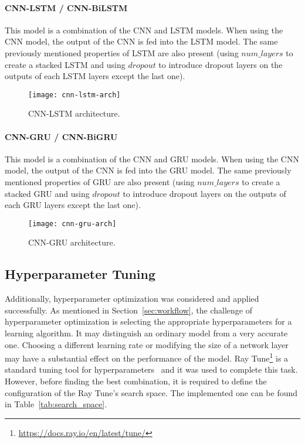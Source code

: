 \paragraph{CNN-LSTM / CNN-BiLSTM}

This model is a combination of the \gls{CNN} and \gls{LSTM} models. When using the \gls{CNN} model, the output of the \gls{CNN} is fed into the \gls{LSTM} model. The same previously mentioned properties of \gls{LSTM} are also present (using $num\_layers$ to create a stacked \gls{LSTM} and using $dropout$ to introduce dropout layers on the outputs of each \gls{LSTM} layers except the last one).

\begin{figure}[htbp]
    \centering
    \texttt{[image: cnn-lstm-arch]}
    \caption{CNN-LSTM architecture.}
    \label{fig:cnn-lstm-arch}
\end{figure}

\paragraph{CNN-GRU / CNN-BiGRU}

This model is a combination of the \gls{CNN} and \gls{GRU} models. When using the \gls{CNN} model, the output of the \gls{CNN} is fed into the \gls{GRU} model. The same previously mentioned properties of \gls{GRU} are also present (using $num\_layers$ to create a stacked \gls{GRU} and using $dropout$ to introduce dropout layers on the outputs of each \gls{GRU} layers except the last one).

\begin{figure}[htbp]
    \centering
    \texttt{[image: cnn-gru-arch]}
    \caption{CNN-GRU architecture.}
    \label{fig:cnn-gru-arch}
\end{figure}

\subsection{Hyperparameter Tuning}

Additionally, hyperparameter optimization was considered and applied successfully. As mentioned in Section~\ref{sec:workflow}, the challenge of hyperparameter optimization is selecting the appropriate hyperparameters for a learning algorithm. It may distinguish an ordinary model from a very accurate one. Choosing a different learning rate or modifying the size of a network layer may have a substantial effect on the performance of the model. Ray Tune\footnote{\href{https://docs.ray.io/en/latest/tune/}{https://docs.ray.io/en/latest/tune/}} is a standard tuning tool for hyperparameters~\cite{Liaw2018Tune:Training} and it was used to complete this task. However, before finding the best combination, it is required to define the configuration of the Ray Tune's search space. The implemented one can be found in Table~\ref{tab:search_space}.

